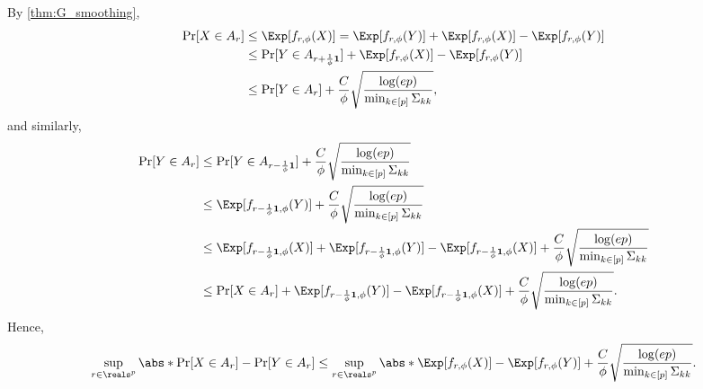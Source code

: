 \documentclass[aos]{imsart}
\begin{document}
\begin{appendix}
By \cref{thm:G_smoothing},
\begin{equation*}
\begin{aligned}
    \Pr[X \in A_r]
    & \leq \Exp[f_{r,\phi}(X)]
    = \Exp[f_{r,\phi}(Y)] + \Exp[f_{r,\phi}(X)] - \Exp[f_{r,\phi}(Y)] \\
    & \leq \Pr[Y \in A_{r + \frac{1}{\phi}\mathbf{1}}]
    + \Exp[f_{r,\phi}(X)] - \Exp[f_{r,\phi}(Y)] \\
    & \leq \Pr[Y \in A_r] + \frac{C}{\phi}\sqrt{\frac{\log(ep)}{\min_{k \in [p]}\Sigma_{kk}}},
\end{aligned}
\end{equation*}
and similarly,
\begin{equation*}
\begin{aligned}
    \Pr[Y \in A_r]
    & \leq \Pr[Y \in A_{r - \frac{1}{\phi}\mathbf{1}}]
    + \frac{C}{\phi}\sqrt{\frac{\log(ep)}{\min_{k \in [p]}\Sigma_{kk}}} \\
    & \leq \Exp[f_{r - \frac{1}{\phi}\mathbf{1},\phi}(Y)]
    + \frac{C}{\phi}\sqrt{\frac{\log(ep)}{\min_{k \in [p]}\Sigma_{kk}}} \\
    & \leq \Exp[f_{r - \frac{1}{\phi}\mathbf{1},\phi}(X)]
    + \Exp[f_{r - \frac{1}{\phi}\mathbf{1},\phi}(Y)]
    - \Exp[f_{r - \frac{1}{\phi}\mathbf{1},\phi}(X)]
    + \frac{C}{\phi}\sqrt{\frac{\log(ep)}{\min_{k \in [p]}\Sigma_{kk}}} \\
    & \leq \Pr[X \in A_r]
    + \Exp[f_{r - \frac{1}{\phi}\mathbf{1},\phi}(Y)]
    - \Exp[f_{r - \frac{1}{\phi}\mathbf{1},\phi}(X)]
    + \frac{C}{\phi}\sqrt{\frac{\log(ep)}{\min_{k \in [p]}\Sigma_{kk}}}.
\end{aligned}
\end{equation*}
Hence,
\begin{equation*}
    \sup_{r \in \reals^p} \abs*{\Pr[X \in A_r] - \Pr[Y \in A_r]}
    \leq \sup_{r \in \reals^p} \abs*{\Exp[f_{r,\phi}(X)] - \Exp[f_{r,\phi}(Y)]} 
    + \frac{C}{\phi}\sqrt{\frac{\log(ep)}{\min_{k \in [p]}\Sigma_{kk}}}.
\end{equation*}

\end{appendix}
\end{document}
